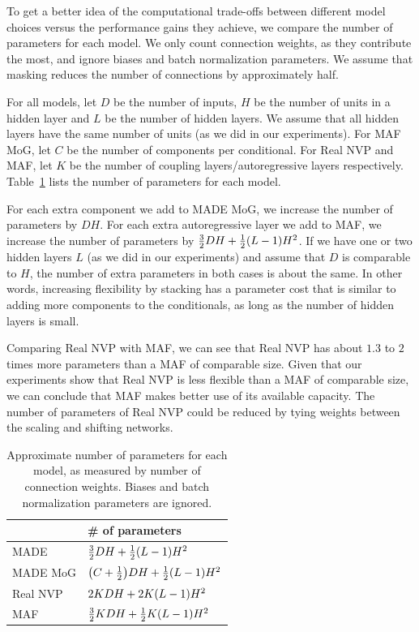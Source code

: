 To get a better idea of the computational trade-offs between different model choices versus the performance gains they achieve, we compare the number of parameters for each model. We only count connection weights, as they contribute the most, and ignore biases and batch normalization parameters. We assume that masking reduces the number of connections by approximately half.

For all models, let $D$ be the number of inputs, $H$ be the number of units in a hidden layer and $L$ be the number of hidden layers. We assume that all hidden layers have the same number of units (as we did in our experiments). For MAF MoG, let $C$ be the number of components per conditional. For Real NVP and MAF, let $K$ be the number of coupling layers/autoregressive layers respectively. Table~\ref{table:parameters} lists the number of parameters for each model.

For each extra component we add to MADE MoG, we increase the number of parameters by $DH$. For each extra autoregressive layer we add to MAF, we increase the number of parameters by $\frac{3}{2}DH + \frac{1}{2}\mathopen{}\left(L-1\right)\mathclose{}H^2$. If we have one or two hidden layers $L$ (as we did in our experiments) and assume that $D$ is comparable to $H$, the number of extra parameters in both cases is about the same. In other words, increasing flexibility by stacking has a parameter cost that is similar to adding more components to the conditionals, as long as the number of hidden layers is small.

Comparing Real NVP with MAF, we can see that Real NVP has about $1.3$ to $2$ times more parameters than a MAF of comparable size. Given that our experiments show that Real NVP is less flexible than a MAF of comparable size, we can conclude that MAF makes better use of its available capacity. The number of parameters of Real NVP could be reduced by tying weights between the scaling and shifting networks.

\begin{table}[tbp]

\caption{Approximate number of parameters for each model, as measured by number of connection weights. Biases and batch normalization parameters are ignored.}
\label{table:parameters}

\renewcommand{\arraystretch}{1.6}
\centering

\begin{tabularx}{0.5\textwidth}{@{}Xl@{}}

\toprule

& \# of parameters \\

\midrule

MADE & $\frac{3}{2}DH + \frac{1}{2}\mathopen{}\left(L-1\right)\mathclose{}H^2 $ \\
MADE MoG & $\mathopen{}\left(C + \frac{1}{2}\right)\mathclose{}DH + \frac{1}{2}\mathopen{}\left(L-1\right)\mathclose{}H^2 $ \\
Real NVP & $2KDH + 2K\mathopen{}\left(L-1\right)\mathclose{}H^2$ \\
MAF & $\frac{3}{2}KDH + \frac{1}{2}K\mathopen{}\left(L-1\right)\mathclose{}H^2 $ \\

\bottomrule

\end{tabularx}
\end{table}



